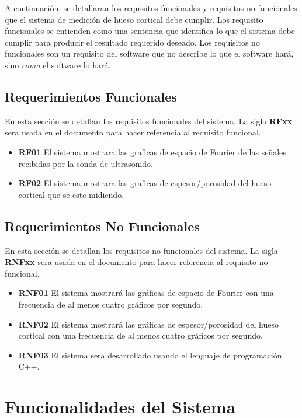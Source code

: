 A continuación, se detallaran los requisitos funcionales y requisitos no funcionales que el sistema de medición de hueso cortical debe cumplir.
Los requisito funcionales se entienden como una sentencia que identifica lo que el sistema debe cumplir para producir el resultado requerido deseado\cite{adams2015non}.
Los requisitos no funcionales son un requisito del software que no describe lo que el software hará, sino \emph{como} el software lo hará\cite{adams2015non}.

\subsection{Requerimientos Funcionales}
\label{ssc:RF}

En esta sección se detallan los requisitos funcionales del sistema. La sigla   \textbf{RFxx} sera usada en el documento para hacer referencia al requisito funcional.

\begin{itemize}
    \item \textbf{RF01} El sistema mostrara las graficas de espacio de Fourier de las señales recibidas por la sonda de ultrasonido.
    \item \textbf{RF02} El sistema mostrara las graficas de espesor/porosidad del hueso cortical que se este midiendo.
\end{itemize}

\subsection{Requerimientos No Funcionales}
\label{ssc:RNF}

En esta sección se detallan los requisitos no funcionales del sistema. La sigla \textbf{RNFxx} sera usada en el documento para hacer referencia al requisito no funcional.

\begin{itemize}
    \item \textbf{RNF01} El sistema mostrará las gráficas de espacio de Fourier con una frecuencia de al menos cuatro gráficos por segundo.
    \item \textbf{RNF02} El sistema mostrará las gráficas de espesor/porosidad del hueso cortical con una frecuencia de al menos cuatro gráficos por segundo.
    \item \textbf{RNF03} El sistema sera desarrollado usando el lenguaje de programación C++.
\end{itemize}

\section{Funcionalidades del Sistema}
\label{sc:FS}

